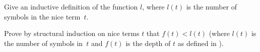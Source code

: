 \documentclass[../../../include/open-logic-section]{subfiles}
\begin{document}
\begin{prob}
  Give an inductive definition of the function $l$, where $l(t)$ is
  the number of symbols in the nice term~$t$.
\end{prob}

\begin{prob}
  Prove by structural induction on nice terms $t$ that $f(t) < l(t)$ (where
  $l(t)$ is the number of symbols in~$t$ and $f(t)$ is the depth of
  $t$ as defined in ).
\end{prob}
\end{document}
